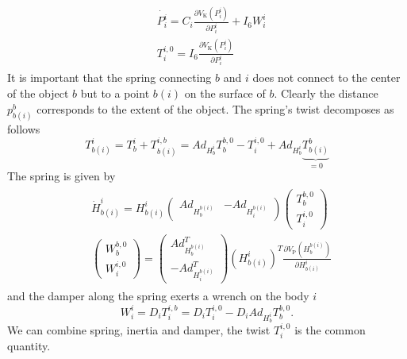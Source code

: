 \documentclass[a4paper,twoside, openright,12pt]{report}
\newcommand{\g}[1]{\text{#1}}
\begin{document}
\begin{eqnarray}
\begin{aligned}
	&\dot{P_i^i} = C_i \frac{\partial V_\g{K}(P_i^i)}{\partial P_i^i} + I_6 W_{i}^i \\
	&T_i^{i,0} = I_6 \frac{\partial V_\g{K}(P_i^i)}{\partial P_i^i}
\end{aligned}
\end{eqnarray}
It is important that the spring connecting $b$ and $i$ does not connect to the center of the object $b$ but to a point $b(i)$ on the surface of $b$. Clearly the distance $p_{b(i)}^b$ corresponds to the extent of the object. The spring's twist decomposes as follows
\begin{equation}
T_{b(i)}^i = T_b^i + T_{b(i)}^{i,b} = Ad_{H_b^i} T_b^{b,0} - T_i^{i,0} + Ad_{H_b^i}\underbrace{T_{b(i)}^b}_{=0}
\end{equation}
The spring is given by    
\begin{eqnarray}
\begin{aligned}
&\dot{H}_{b(i)}^i = H_{b(i)}^i \begin{pmatrix}
Ad_{H_b^{b(i)}} & - Ad_{H_i^{b(i)}} \end{pmatrix} \begin{pmatrix} 
T_b^{b,0} \\ T_i^{i,0}\end{pmatrix}\\
&\begin{pmatrix} 
W_b^{b,0} \\ W_i^{i,0} \end{pmatrix} = \begin{pmatrix}
Ad_{H_b^{b(i)}}^T \\ - Ad_{H_i^{b(i)}}^T\end{pmatrix}
(H_{b(i)}^i)^T
\frac{\partial V_\g{P}(H_b^{b(i)})}{\partial H_{b(i)}^i}
\end{aligned}
\end{eqnarray}
and the damper along the spring exerts a wrench on the body $i$
\begin{equation}
W_i^i = D_i T_i^{i,b} = D_i T_i^{i,0} - D_i Ad_{H_b^i} T_b^{b,0}.
\end{equation}
We can combine spring, inertia and damper, the twist $T_i^{i,0}$ is the common quantity.
\end{document}
